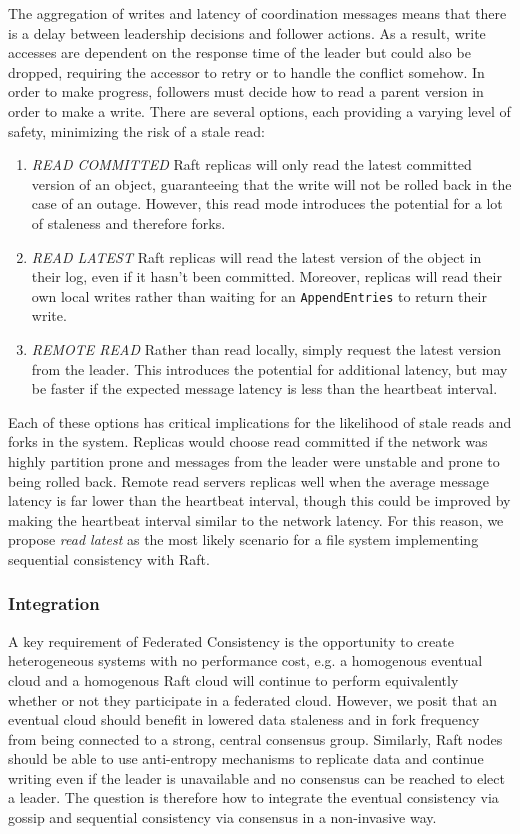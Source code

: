 \documentclass{article}
\begin{document}
The aggregation of writes and latency of coordination messages means that there is a delay between leadership decisions and follower actions. As a result, write accesses are dependent on the response time of the leader but could also be dropped, requiring the accessor to retry or to handle the conflict somehow. In order to make progress, followers must decide how to read a parent version in order to make a write. There are several options, each providing a varying level of safety, minimizing the risk of a stale read:

\begin{enumerate}
    \item \textit{READ COMMITTED} Raft replicas will only read the latest committed version of an object, guaranteeing that the write will not be rolled back in the case of an outage. However, this read mode introduces the potential for a lot of staleness and therefore forks.
    \item \textit{READ LATEST} Raft replicas will read the latest version of the object in their log, even if it hasn't been committed. Moreover, replicas will read their own local writes rather than waiting for an \texttt{AppendEntries} to return their write.
    \item \textit{REMOTE READ} Rather than read locally, simply request the latest version from the leader. This introduces the potential for additional latency, but may be faster if the expected message latency is less than the heartbeat interval.
\end{enumerate}

Each of these options has critical implications for the likelihood of stale reads and forks in the system. Replicas would choose read committed if the network was highly partition prone and messages from the leader were unstable and prone to being rolled back. Remote read servers replicas well when the average message latency is far lower than the heartbeat interval, though this could be improved by making the heartbeat interval similar to the network latency. For this reason, we propose \textit{read latest} as the most likely scenario for a file system implementing sequential consistency with Raft.

\subsubsection{Integration}

A key requirement of Federated Consistency is the opportunity to create heterogeneous systems with no performance cost, e.g. a homogenous eventual cloud and a homogenous Raft cloud will continue to perform equivalently whether or not they participate in a federated cloud. However, we posit that an eventual cloud should benefit in lowered data staleness and in fork frequency from being connected to a strong, central consensus group. Similarly, Raft nodes should be able to use anti-entropy mechanisms to replicate data and continue writing even if the leader is unavailable and no consensus can be reached to elect a leader. The question is therefore how to integrate the eventual consistency via gossip and sequential consistency via consensus in a non-invasive way.
\end{document}
